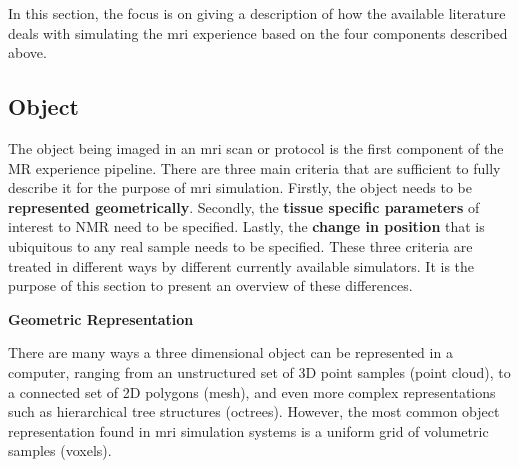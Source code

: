 In this section, the focus is on giving a description of how the available literature deals with simulating the \ac{mri} experience based on the four components described above.

\hfill

\subsection{Object}

The object being imaged in an \ac{mri} scan or protocol is the first component of the MR experience pipeline.
There are three main criteria that are sufficient to fully describe it for the purpose of \ac{mri} simulation.
Firstly, the object needs to be \textbf{represented geometrically}. 
Secondly, the \textbf{tissue specific parameters} of interest to NMR need to be specified.
Lastly, the \textbf{change in position} that is ubiquitous to any real sample needs to be specified.
These three criteria are treated in different ways by different currently available simulators. 
It is the purpose of this section to present an overview of these differences.

\hfill

\large \textbf{Geometric Representation} \normalsize

There are many ways a three dimensional object can be represented in a computer, ranging from an unstructured set of 3D point samples (point cloud), to a connected set of 2D polygons (mesh), and even more complex representations such as hierarchical tree structures (octrees).
However, the most common object representation found in \ac{mri} simulation systems is a uniform grid of volumetric samples (voxels).

\hfill

